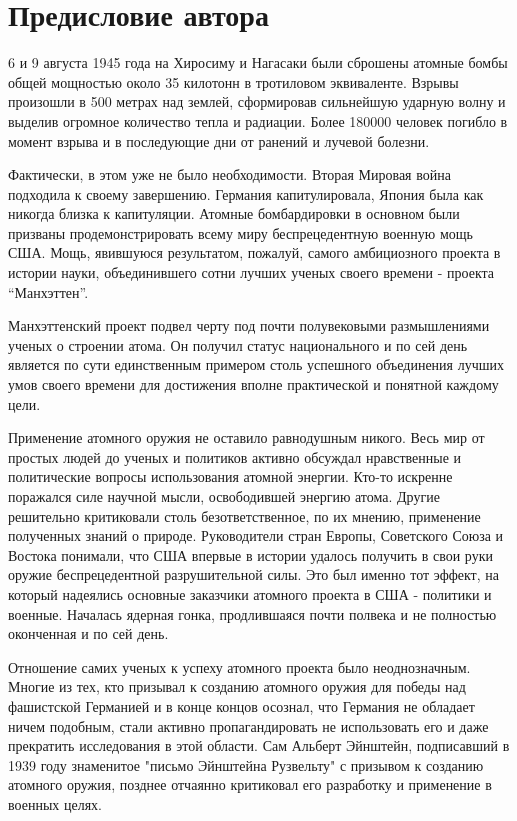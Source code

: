 \chapter*{Предисловие автора}

6 и 9 августа 1945 года на Хиросиму и Нагасаки были сброшены атомные бомбы общей мощностью около 35 килотонн в тротиловом эквиваленте.
Взрывы произошли в 500 метрах над землей, сформировав сильнейшую ударную волну и выделив огромное количество тепла и радиации.
Более 180000 человек погибло в момент взрыва и в последующие дни от ранений и лучевой болезни.  

Фактически, в этом уже не было необходимости. 
Вторая Мировая война подходила к своему завершению. 
Германия капитулировала, Япония была как никогда близка к капитуляции.
Атомные бомбардировки в основном были призваны продемонстрировать всему миру беспрецедентную военную мощь США. 
Мощь, явившуюся результатом, пожалуй, самого амбициозного проекта в истории науки, объединившего сотни лучших ученых своего времени - проекта ``Манхэттен''. 

Манхэттенский проект подвел черту под почти полувековыми размышлениями ученых о строении атома. 
Он получил статус национального и по сей день является по сути единственным примером столь успешного объединения лучших умов своего времени для достижения вполне практической и понятной каждому цели.

Применение атомного оружия не оставило равнодушным никого.
Весь мир от простых людей до ученых и политиков активно обсуждал нравственные и политические вопросы использования атомной энергии.
Кто-то искренне поражался силе научной мысли, освободившей энергию атома.
Другие решительно критиковали столь безответственное, по их мнению, применение полученных знаний о природе.
Руководители стран Европы, Советского Союза и Востока понимали, что США впервые в истории удалось получить в свои руки оружие беспрецедентной разрушительной силы. 
Это был именно тот эффект, на который надеялись основные заказчики атомного проекта в США - политики и военные.  
Началась ядерная гонка, продлившаяся почти полвека и не полностью оконченная и по сей день.

Отношение самих ученых к успеху атомного проекта было неоднозначным.
Многие из тех, кто призывал к созданию атомного оружия для победы над фашистской Германией и в конце концов осознал, что Германия не обладает ничем подобным, стали активно пропагандировать не использовать его и даже прекратить исследования в этой области. 
Сам Альберт Эйнштейн, подписавший в 1939 году знаменитое "письмо Эйнштейна Рузвельту" с призывом к созданию атомного оружия, позднее отчаянно критиковал его разработку и применение в военных целях.

